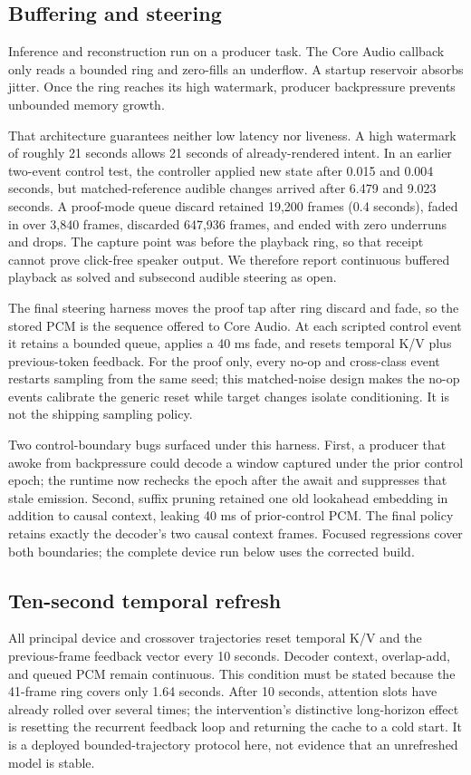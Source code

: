 \documentclass[10pt]{article}
\begin{document}
\subsection{Buffering and steering}
Inference and reconstruction run on a producer task. The Core Audio callback only reads a bounded ring and zero-fills an underflow. A startup reservoir absorbs jitter. Once the ring reaches its high watermark, producer backpressure prevents unbounded memory growth.

That architecture guarantees neither low latency nor liveness. A high watermark of roughly 21 seconds allows 21 seconds of already-rendered intent. In an earlier two-event control test, the controller applied new state after 0.015 and 0.004 seconds, but matched-reference audible changes arrived after 6.479 and 9.023 seconds. A proof-mode queue discard retained 19,200 frames (0.4 seconds), faded in over 3,840 frames, discarded 647,936 frames, and ended with zero underruns and drops. The capture point was before the playback ring, so that receipt cannot prove click-free speaker output. We therefore report continuous buffered playback as solved and subsecond audible steering as open.

The final steering harness moves the proof tap after ring discard and fade, so the stored PCM is the sequence offered to Core Audio. At each scripted control event it retains a bounded queue, applies a 40 ms fade, and resets temporal K/V plus previous-token feedback. For the proof only, every no-op and cross-class event restarts sampling from the same seed; this matched-noise design makes the no-op events calibrate the generic reset while target changes isolate conditioning. It is not the shipping sampling policy.

Two control-boundary bugs surfaced under this harness. First, a producer that awoke from backpressure could decode a window captured under the prior control epoch; the runtime now rechecks the epoch after the await and suppresses that stale emission. Second, suffix pruning retained one old lookahead embedding in addition to causal context, leaking 40 ms of prior-control PCM. The final policy retains exactly the decoder's two causal context frames. Focused regressions cover both boundaries; the complete device run below uses the corrected build.

\subsection{Ten-second temporal refresh}
All principal device and crossover trajectories reset temporal K/V and the previous-frame feedback vector every 10 seconds. Decoder context, overlap-add, and queued PCM remain continuous. This condition must be stated because the 41-frame ring covers only 1.64 seconds. After 10 seconds, attention slots have already rolled over several times; the intervention's distinctive long-horizon effect is resetting the recurrent feedback loop and returning the cache to a cold start. It is a deployed bounded-trajectory protocol here, not evidence that an unrefreshed model is stable.
\end{document}
